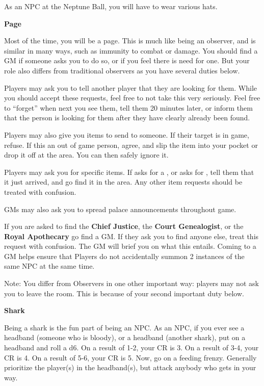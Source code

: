 \documentclass[green]{NeptuneBall}
\begin{document}
\name{\gNPC{}}

As an NPC at the Neptune Ball, you will have to wear various hats.

{\bf Page}

Most of the time, you will be a page. This is much like being an observer, and is similar in many ways, such as immunity to combat or damage. You should find a GM if someone asks you to do so, or if you feel there is need for one. But your role also differs from traditional observers as you have several duties below.

Players may ask you to tell another player that they are looking for them. While you should accept these requests, feel free to not take this very seriously. Feel free to "`forget"' when next you see them, tell them 20 minutes later, or inform them that the person is looking for them after they have clearly already been found. 

Players may also give you items to send to someone. If their target is in game, refuse. If this an out of game person, agree, and slip the item into your pocket or drop it off at the \pGM{} area. You can then safely ignore it.

Players may ask you for specific items. If \cPriest{} asks for a \iBaby{}, or \cSpy{} asks for \iScroll{}, tell them that it just arrived, and go find it in the \pGM{} area. Any other item requests should be treated with confusion.

GMs may also ask you to spread palace announcements throughout game.

If you are asked to find the \textbf{Chief Justice}, the \textbf{Court Genealogist}, or the \textbf{Royal Apothecary} go find a GM. If they ask you to find anyone else, treat this request with confusion. The GM will brief you on what this entails. Coming to a GM helps ensure that Players do not accidentally summon 2 instances of the same NPC at the same time.

Note: You differ from Observers in one other important way: players may not ask you to leave the room. This is because of your second important duty below.

{\bf Shark}

Being a shark is the fun part of being an NPC. As an NPC, if you ever see a  headband (someone who is bloody), or a  headband (another shark), put on a  headband and roll a d6. On a result of 1-2, your CR is 3. On a result of 3-4, your CR is 4. On a result of 5-6, your CR is 5. Now, go on a feeding frenzy. Generally prioritize the player(s) in the  headband(s), but attack anybody who gets in your way. 
\end{document}
